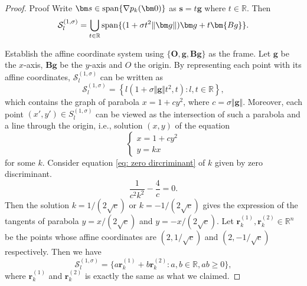 \documentclass[colorlinks=true, linkcolor=blue, citecolor=blue, urlcolor=blue]{article}
\theoremstyle{plain}
\theoremstyle{definition}
\theoremstyle{remark}
\newcommand{\RR}{\mathbb{R}}
\begin{document}
\begin{proof}{Proof}
Write $\bm s\in {\rm span}\{\nabla p_k(\bm 0)\}$ as $\bm s=t\bm g$ where $t\in \mathbb{R}$. Then 
\begin{equation*}\mathcal{S}_l^{(1,\sigma)}=\bigcup\limits_{t\in\mathbb{R}}{\rm span}\{(1+\sigma t^2\Vert \bm g\Vert)\bm g+t\bm{Bg}\}.
\end{equation*}

Establish the affine coordinate system using $\{\bm O,\bm g,\bm B\bm g\}$ as the frame. Let $\bm g$ be the $x$-axis, $\bm B\bm g$ be the $y$-axis and $O$ the origin. By representing each point with its affine coordinates, $\mathcal{S}_l^{(1,\sigma)}$ can be written as
\begin{equation*}
    \mathcal{S}_l^{(1,\sigma)}=\left\{l\left(1+\sigma \Vert \bm g\Vert t^2,t\right):l,t\in\RR\right\}, 
\end{equation*}
which contains the graph of parabola $x=1+cy^2$, where $c=\sigma\Vert\bm g\Vert$. Moreover, each point $(x',y')\in S_l^{(1,\sigma)}$ can be viewed as the intersection of such a parabola and a line through the origin, i.e.,
solution $(x,y)$ of the equation
\begin{equation*}
    \begin{cases}
        x=1+cy^2\\
        y=kx
    \end{cases}
\end{equation*}
for some $k$. Consider equation \eqref{eq: zero dircriminant} of $k$ given by zero discriminant.
\begin{equation}\label{eq: zero dircriminant}
    \frac{1}{c^2k^2}-\frac{4}{c}=0.
\end{equation}
Then the solution $k=1/(2\sqrt{c})$ or $k=-1/(2\sqrt{c})$ gives the expression of the tangents of parabola $y=x/(2\sqrt{c})$ and $y=-x/(2\sqrt{c})$. Let $\bm r_k^{(1)},\bm r_k^{(2)}\in\RR^n$ be the points whose affine coordinates are $(2,1/\sqrt{c})$ and $(2,-1/\sqrt{c})$ respectively. Then we have
\begin{equation*}
    \mathcal{S}_l^{(1,\sigma)}=\{a\bm r_k^{(1)}+b\bm r_k^{(2)}:a,b\in\RR,ab\geq 0\},
\end{equation*}
where $\bm r_k^{(1)}$ and $\bm r_k^{(2)}$ is exactly the same as what we claimed.
\end{proof}
\end{document}
